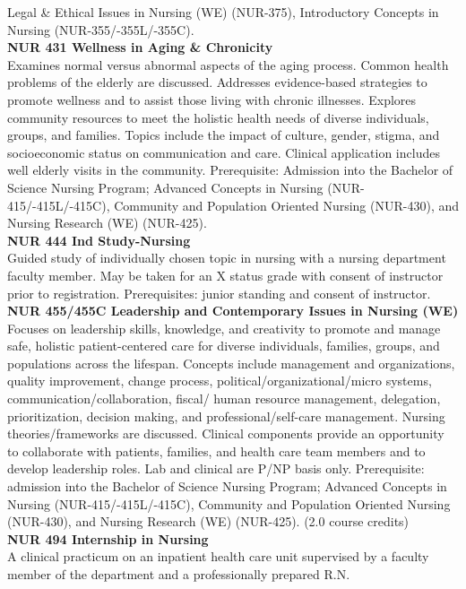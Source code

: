 \documentclass[
  letterpaper,
]{scrbook}
\begin{document}
Legal \& Ethical Issues in Nursing (WE) (NUR-375), Introductory Concepts
in Nursing (NUR-355/-355L/-355C).\\
\textbf{NUR 431 Wellness in Aging \& Chronicity}\\
Examines normal versus abnormal aspects of the aging process. Common
health problems of the elderly are discussed. Addresses evidence-based
strategies to promote wellness and to assist those living with chronic
illnesses. Explores community resources to meet the holistic health
needs of diverse individuals, groups, and families. Topics include the
impact of culture, gender, stigma, and socioeconomic status on
communication and care. Clinical application includes well elderly
visits in the community. Prerequisite: Admission into the Bachelor of
Science Nursing Program; Advanced Concepts in Nursing
(NUR-415/-415L/-415C), Community and Population Oriented Nursing
(NUR-430), and Nursing Research (WE) (NUR-425).\\
\textbf{NUR 444 Ind Study-Nursing}\\
Guided study of individually chosen topic in nursing with a nursing
department faculty member. May be taken for an X status grade with
consent of instructor prior to registration. Prerequisites: junior
standing and consent of instructor.\\
\textbf{NUR 455/455C Leadership and Contemporary Issues in Nursing
(WE)}\\
Focuses on leadership skills, knowledge, and creativity to promote and
manage safe, holistic patient-centered care for diverse individuals,
families, groups, and populations across the lifespan. Concepts include
management and organizations, quality improvement, change process,
political/organizational/micro systems, communication/collaboration,
fiscal/ human resource management, delegation, prioritization, decision
making, and professional/self-care management. Nursing
theories/frameworks are discussed. Clinical components provide an
opportunity to collaborate with patients, families, and health care team
members and to develop leadership roles. Lab and clinical are P/NP basis
only. Prerequisite: admission into the Bachelor of Science Nursing
Program; Advanced Concepts in Nursing (NUR-415/-415L/-415C), Community
and Population Oriented Nursing (NUR-430), and Nursing Research (WE)
(NUR-425). (2.0 course credits)\\
\textbf{NUR 494 Internship in Nursing}\\
A clinical practicum on an inpatient health care unit supervised by a
faculty member of the department and a professionally prepared R.N.
\end{document}
